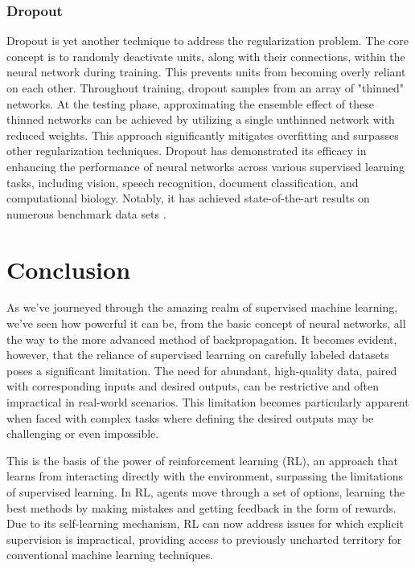 \documentclass{article}
\begin{document}
\subsubsection{Dropout}%
  \label{sub:Dropout}
  Dropout is yet another technique to address the regularization problem. The core concept is to randomly deactivate units, along with their connections, within the neural network during training. This prevents units from becoming overly reliant on each other. Throughout training, dropout samples from an array of "thinned" networks. At the testing phase, approximating the ensemble effect of these thinned networks can be achieved by utilizing a single unthinned network with reduced weights. This approach significantly mitigates overfitting and surpasses other regularization techniques. Dropout has demonstrated its efficacy in enhancing the performance of neural networks across various supervised learning tasks, including vision, speech recognition, document classification, and computational biology. Notably, it has achieved state-of-the-art results on numerous benchmark data sets \citep{JMLR:v15:srivastava14a}.
    \section{Conclusion}%
    \label{sec:Conclusion}
As we've journeyed through the amazing realm of supervised machine learning, we've seen how powerful it can be, from the basic concept of neural networks, all the way to the more advanced method of backpropagation. It becomes evident, however, that the reliance of supervised learning on carefully labeled datasets poses a significant limitation. The need for abundant, high-quality data, paired with corresponding inputs and desired outputs, can be restrictive and often impractical in real-world scenarios. This limitation becomes particularly apparent when faced with complex tasks where defining the desired outputs may be challenging or even impossible. 

This is the basis of the power of reinforcement learning (RL), an approach that learns from interacting directly with the environment, surpassing the limitations of supervised learning. In RL, agents move through a set of options, learning the best methods by making mistakes and getting feedback in the form of rewards. Due to its self-learning mechanism, RL can now address issues for which explicit supervision is impractical, providing access to previously uncharted territory for conventional machine learning techniques.
\end{document}
